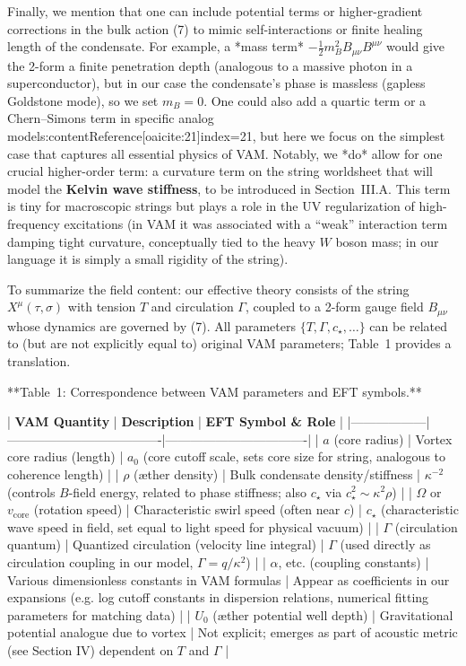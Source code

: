 \documentclass[12pt]{article}
\begin{document}
Finally, we mention that one can include potential terms or higher-gradient corrections in the bulk action (7) to mimic self-interactions or finite healing length of the condensate. For example, a *mass term* $-\frac{1}{2} m_B^2 B_{\mu\nu}B^{\mu\nu}$ would give the 2-form a finite penetration depth (analogous to a massive photon in a superconductor), but in our case the condensate’s phase is massless (gapless Goldstone mode), so we set $m_B=0$. One could also add a quartic term or a Chern–Simons term in specific analog models:contentReference[oaicite:21]{index=21}, but here we focus on the simplest case that captures all essential physics of VAM. Notably, we *do* allow for one crucial higher-order term: a curvature term on the string worldsheet that will model the \textbf{Kelvin wave stiffness}, to be introduced in Section III.A. This term is tiny for macroscopic strings but plays a role in the UV regularization of high-frequency excitations (in VAM it was associated with a “weak” interaction term damping tight curvature, conceptually tied to the heavy $W$ boson mass; in our language it is simply a small rigidity of the string).

To summarize the field content: our effective theory consists of the string $X^\mu(\tau,\sigma)$ with tension $T$ and circulation $\Gamma$, coupled to a 2-form gauge field $B_{\mu\nu}$ whose dynamics are governed by (7). All parameters $\{T,\Gamma,c_\star,\ldots\}$ can be related to (but are not explicitly equal to) original VAM parameters; Table 1 provides a translation. 

**Table 1: Correspondence between VAM parameters and EFT symbols.**

| \textbf{VAM Quantity} | \textbf{Description}                     | \textbf{EFT Symbol & Role}            |
|------------------|-------------------------------------|----------------------------------|
| $a$ (core radius)           | Vortex core radius (length)     | $a_0$ (core cutoff scale, sets core size for string, analogous to coherence length) |
| $\rho$ (æther density)      | Bulk condensate density/stiffness | $\kappa^{-2}$ (controls $B$-field energy, related to phase stiffness; also $c_\star$ via $c_\star^2 \sim \kappa^2 \rho$) |
| $\Omega$ or $v_{\text{core}}$ (rotation speed) | Characteristic swirl speed (often near $c$) | $c_\star$ (characteristic wave speed in field, set equal to light speed for physical vacuum) |
| $\Gamma$ (circulation quantum) | Quantized circulation (velocity line integral) | $\Gamma$ (used directly as circulation coupling in our model, $\Gamma = q/\kappa^2$) |
| $\alpha$, etc. (coupling constants) | Various dimensionless constants in VAM formulas | Appear as coefficients in our expansions (e.g. log cutoff constants in dispersion relations, numerical fitting parameters for matching data) |
| $U_0$ (æther potential well depth) | Gravitational potential analogue due to vortex | Not explicit; emerges as part of acoustic metric (see Section IV) dependent on $T$ and $\Gamma$ |
\end{document}
